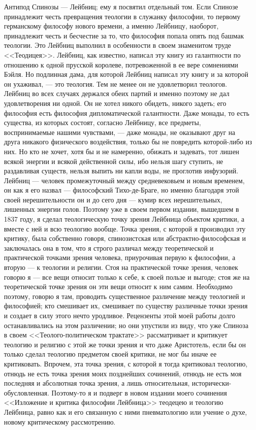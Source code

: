 \documentclass[12pt]{article}
\begin{document}
Антипод Спинозы --- Лейбниц; ему я посвятил отдельный том. Если Спинозе принадлежит честь превращения теологии в служанку философии, то первому германскому философу нового времени, а именно Лейбницу, наоборот, принадлежит честь и бесчестие за то, что философия попала опять под башмак теологии. Это Лейбниц выполнил в особенности в своем знаменитом труде <<Теодицея>>. Лейбниц, как известно, написал эту книгу из галантности по отношению к одной прусской королеве, потревоженной в ее вере сомнениями Бэйля. Но подлинная дама, для которой Лейбниц написал эту книгу и за которой он ухаживал, --- это теология. Тем не менее он не удовлетворил теологов. Лейбниц во всех случаях держался обеих партий и именно поэтому не дал удовлетворения ни одной. Он не хотел никого обидеть, никого задеть; его философия есть философия дипломатической галантности. Даже монады, то есть существа, из которых состоят, согласно Лейбницу, все предметы, воспринимаемые нашими чувствами, --- даже монады, не оказывают друг на друга никакого физического воздействия, только бы не повредить которой-либо из них. Но кто не хочет, хотя бы и не намеренно, обижать и задевать, тот лишен всякой энергии и всякой действенной силы, ибо нельзя шагу ступить, не раздавливая существ, нельзя выпить ни капли воды, не проглотив инфузорий. Лейбниц --- человек промежуточный между средневековьем и новым временем, он как я его назвал --- философский Тихо-де-Браге, но именно благодаря этой своей нерешительности он и до сего дня --- кумир всех нерешительных, лишенных энергии голов. Поэтому уже в своем первом издании, вышедшем в 1837 году, я сделал теологическую точку зрения Лейбница объектом критики, а вместе с ней и всю теологию вообще. Точка зрения, с которой я производил эту критику, была собственно говоря, спинозистская или абстрактно-философская и заключалась она в том, что я строго различал между теоретической и практической точками зрения человека, приурочивая первую к философии, а вторую --- к теологии и религии. Стоя на практической точке зрения, человек говорю я --- все вещи относит только к себе, к своей пользе и выгоде; стоя же на теоретической точке зрения он эти вещи относит к ним самим. Необходимо поэтому, говорю я там, проводить существенное различение между теологией и философией; кто смешивает их, смешивает по существу различные точки зрения и создает в силу этого нечто уродливое. Рецензенты этой моей работы долго останавливались на этом различении; но они упустили из виду, что уже Спиноза в своем <<Теолого-политическом трактате>> рассматривает и критикует теологию и религию с этой же точки зрения и что даже Аристотель, если бы он только сделал теологию предметом своей критики, не мог бы иначе ее критиковать. Впрочем, эта точка зрения, с которой я тогда критиковал теологию, отнюдь не есть точка зрения моих позднейших сочинений, отнюдь не есть моя последняя и абсолютная точка зрения, а лишь относительная, исторически-обусловленная. Поэтому-то я и подверг в новом издании моего сочинения <<Изложение и критика философии Лейбница>> теодецею и теологию Лейбница, равно как и его связанную с ними пневматологию или учение о духе, новому критическому рассмотрению.
\end{document}
